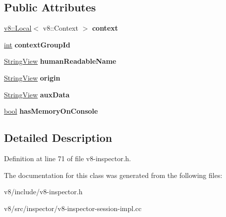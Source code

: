 \subsection*{Public Attributes}
\begin{DoxyCompactItemize}
\item 
\mbox{\label{classv8__inspector_1_1V8ContextInfo_a24c69a2cb86febdcd30605f9edea8b21}} 
\mbox{\hyperlink{classv8_1_1Local}{v8\+::\+Local}}$<$ v8\+::\+Context $>$ {\bfseries context}
\item 
\mbox{\label{classv8__inspector_1_1V8ContextInfo_a4958fb8bfe5ec4aa77ebdfe29b1e9a30}} 
\mbox{\hyperlink{classint}{int}} {\bfseries context\+Group\+Id}
\item 
\mbox{\label{classv8__inspector_1_1V8ContextInfo_a393412db9d07a12be7b4bf8f3465b8fd}} 
\mbox{\hyperlink{classv8__inspector_1_1StringView}{String\+View}} {\bfseries human\+Readable\+Name}
\item 
\mbox{\label{classv8__inspector_1_1V8ContextInfo_acd3feac7585871ae24b2cf910140b743}} 
\mbox{\hyperlink{classv8__inspector_1_1StringView}{String\+View}} {\bfseries origin}
\item 
\mbox{\label{classv8__inspector_1_1V8ContextInfo_afda75b31c49cd9f4e664ec7068979d9a}} 
\mbox{\hyperlink{classv8__inspector_1_1StringView}{String\+View}} {\bfseries aux\+Data}
\item 
\mbox{\label{classv8__inspector_1_1V8ContextInfo_a2c523d93043e7f4b018c470dad60b41f}} 
\mbox{\hyperlink{classbool}{bool}} {\bfseries has\+Memory\+On\+Console}
\end{DoxyCompactItemize}


\subsection{Detailed Description}


Definition at line 71 of file v8-\/inspector.\+h.



The documentation for this class was generated from the following files\+:\begin{DoxyCompactItemize}
\item 
v8/include/v8-\/inspector.\+h\item 
v8/src/inspector/v8-\/inspector-\/session-\/impl.\+cc\end{DoxyCompactItemize}
